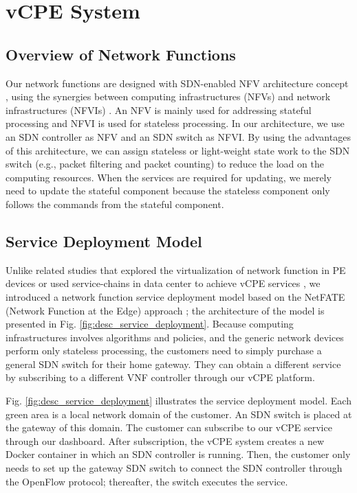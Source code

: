 \documentclass[conference]{IEEEtran}
\begin{document}
\section{vCPE System}
\subsection{Overview of Network Functions} \label{ssec:desc_nfv_overview}
Our network functions are designed with SDN-enabled NFV architecture concept \cite{sdn-enabled}, using the synergies between computing infrastructures (NFVs) and network infrastructures (NFVIs) \cite{etsi-nfv-terminology, etsi-nfv-infra}.
An NFV is mainly used for addressing stateful processing and NFVI is used for stateless processing. In our architecture, we use an SDN controller as NFV and an SDN switch as NFVI.
By using the advantages of this architecture, we can assign stateless or light-weight state work to the SDN switch (e.g., packet filtering and packet counting) to reduce the load on the computing resources.
When the services are required for updating, we merely need to update the stateful component because the stateless component only follows the commands from the stateful component.




\subsection{Service Deployment Model}
Unlike related studies that explored the virtualization of network function in PE devices \cite{vcpe-enhance} or used service-chains in data center to achieve vCPE services \cite{ericcson-vcpe}, we introduced a network function service deployment model based on the NetFATE (Network Function at the Edge) approach \cite{netfate}; the architecture of the model is presented in Fig. \ref{fig:desc_service_deployment}.
Because computing infrastructures involves algorithms and policies, and the generic network devices perform only stateless processing, the customers need to simply purchase a general SDN switch for their home gateway. They can obtain a different service by subscribing to a different VNF controller through our vCPE platform.

Fig. \ref{fig:desc_service_deployment} illustrates the service deployment model. Each green area is a local network domain of the customer. An SDN switch is placed at the gateway of this domain. The customer can subscribe to our vCPE service through our dashboard. After subscription, the vCPE system creates a new Docker container in which an SDN controller is running. Then, the customer only needs to set up the gateway SDN switch to connect the SDN controller through the OpenFlow protocol; thereafter, the switch executes the service.
\end{document}
